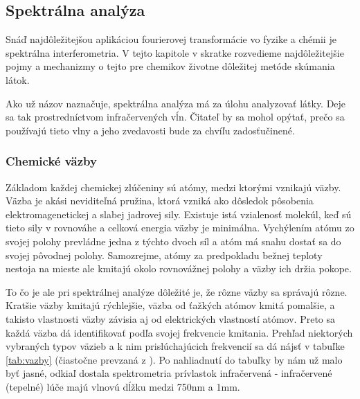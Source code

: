 \subsection{Spektrálna analýza}

Snáď najdôležitejšou aplikáciou fourierovej transformácie vo fyzike a
chémii je spektrálna interferometria. V tejto kapitole v skratke
rozvedieme najdôležitejšie pojmy a mechanizmy o tejto pre chemikov
životne dôležitej metóde skúmania látok.


Ako už názov naznačuje, spektrálna analýza má za úlohu analyzovať
látky. Deje sa tak prostredníctvom infračervených vĺn. Čitateľ by sa
mohol opýtať, prečo sa používajú tieto vlny a jeho zvedavosti bude za
chvíľu zadosťučinené.

\subsubsection{Chemické väzby}

Základom každej chemickej zlúčeniny sú atómy, medzi ktorými vznikajú
väzby. Väzba je akási neviditeľná pružina, ktorá vzniká ako dôsledok
pôsobenia elektromagenetickej a slabej jadrovej sily. Existuje istá
vzialenosť molekúl, keď sú tieto sily v rovnováhe a celková energia
väzby je minimálna. Vychýlením atómu zo svojej polohy prevládne jedna
z týchto dvoch síl a atóm má snahu dostať sa do svojej pôvodnej
polohy. Samozrejme, atómy za predpokladu bežnej teploty nestoja na
mieste ale kmitajú okolo rovnovážnej polohy a väzby ich držia pokope.

To čo je ale pri spektrálnej analýze dôležité je, že rôzne väzby sa
správajú rôzne. Kratšie väzby kmitajú rýchlejšie, väzba od ťažkých
atómov kmitá pomalšie, a takisto vlastnosti väzby závisia aj od
elektrických vlastností atómov. Preto sa každá väzba dá identifikovať
podľa svojej frekvencie kmitania. Prehľad niektorých vybraných typov
väzieb a k nim prislúchajúcich frekvencií sa dá nájsť v tabuľke 
\ref{tab:vazby} (čiastočne prevzaná z \cite{wiki:spectro}).
Po nahliadnutí do tabuľky by nám už malo byť jasné, odkiaľ dostala
spektrometria prívlastok infračervená - infračervené (tepelné) lúče
majú vlnovú dĺžku medzi 750nm a 1mm.

